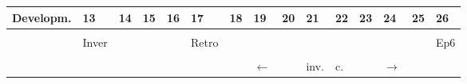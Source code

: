 \documentclass[11pt]{article}
\begin{document}
\begin{center}
\begin{tabular}{rllllllllllllll}
Developm. & 13 & 14 & 15 & 16 & 17 & 18 & 19 & 20 & 21 & 22 & 23 & 24 & 25 & 26\\
\hline
 & \phantom{Sub}\cellcolor{red!10} & \phantom{Sub}\cellcolor{red!10} & \phantom{Sub}\cellcolor{gray!30} & \phantom{Sub}\cellcolor{gray!30} & \phantom{Sub}\cellcolor{yellow!10} & \phantom{Sub}\cellcolor{yellow!10} & \phantom{Sub}\cellcolor{yellow!30} & \phantom{Sub}\cellcolor{yellow!30} & \phantom{Sub}\cellcolor{red!50} & \phantom{Sub}\cellcolor{orange!40} & \phantom{Sub}\cellcolor{orange!40} & \phantom{Sub}\cellcolor{orange!10} & \phantom{Sub}\cellcolor{gray!30} & \\
 & \tiny\color{gray!90}Inver\cellcolor{yellow!10} & \phantom{Sub}\cellcolor{yellow!10} & \phantom{Sub}\cellcolor{blue!30} & \phantom{Sub}\cellcolor{gray!30} & \tiny\color{gray!90}Retro\cellcolor{red!10} & \phantom{Sub}\cellcolor{red!10} & \phantom{Sub}\cellcolor{red!30} & \phantom{Sub}\cellcolor{red!30} & \phantom{Sub}\cellcolor{blue!30} & \phantom{Sub}\cellcolor{orange!25} & \phantom{Sub}\cellcolor{orange!25} & \phantom{Sub}\cellcolor{orange!10} & \phantom{Sub}\cellcolor{gray!30} & \color{gray!50}Ep6\cellcolor{violet!50}\\
 & \phantom{Sub}\cellcolor{blue!10} & \phantom{Sub}\cellcolor{blue!10} & \phantom{Sub}\cellcolor{gray!30} & \phantom{Sub}\cellcolor{gray!30} & \phantom{Sub}\cellcolor{blue!10} & \phantom{Sub}\cellcolor{blue!10} & \phantom{Sub}\cellcolor{blue!30} & \phantom{Sub}\cellcolor{blue!30} & \phantom{Sub}\cellcolor{green!30} & \phantom{Sub}\cellcolor{orange!10} & \phantom{Sub}\cellcolor{orange!10} &  & \phantom{Sub}\cellcolor{gray!30} & \phantom{Sub}\cellcolor{violet!80}\\
 &  &  &  &  &  &  & \(\longleftarrow\) &  & inv. & c. &  & \(\longrightarrow\) &  & \\
\end{tabular}
\end{center}
\end{document}
